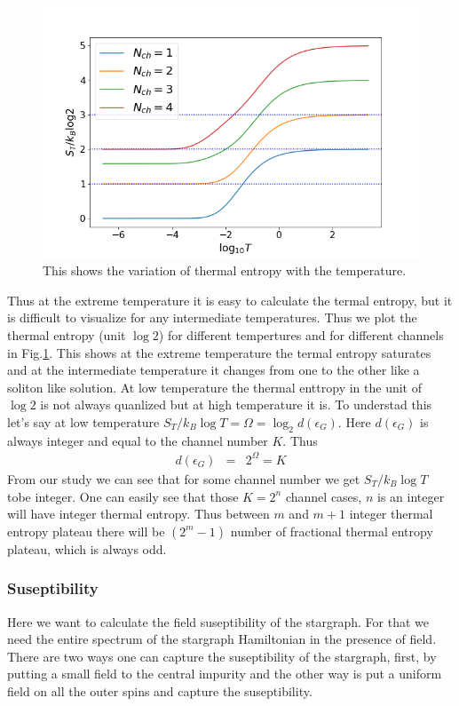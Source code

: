\documentclass[reprint,prb,superscriptaddress]{revtex4-1}
\begin{document}
\begin{figure}
\centering
\includegraphics[scale=0.36]{plt/ThermalEntanglementVS_LogTemperature_}
\caption{This shows the variation of thermal entropy with the temperature.}
\label{fig:thermal_entropy}
\end{figure}

Thus at the extreme temperature it is easy to calculate the termal entropy, but it is difficult to visualize for any intermediate temperatures. Thus we plot the thermal entropy (unit $\log 2$) for different tempertures and for different channels in Fig.\ref{fig:thermal_entropy}. This shows at the extreme temperature the termal entropy saturates and at the intermediate temperature it changes from one to the other like a soliton like solution. At low temperature the thermal enttropy in the unit of $\log 2$ is not always quanlized but at high temperature it is. To understad this let's say at low temperature $S_T/k_B\log T=\Omega=\log_2 d(\epsilon_{G})$. Here $d(\epsilon_{G})$ is always integer and equal to the channel number $K$. Thus 
\begin{eqnarray}
d(\epsilon_{G}) &=& 2^{\Omega}=K
\end{eqnarray}
From our study we can see that for some channel number we get $S_T/k_B\log T$ tobe integer. One can easily see that those $K=2^n$ channel cases, $n$ is an integer will have integer thermal entropy. Thus between $m$ and $m+1$ integer thermal entropy plateau there will be $(2^m-1)$ number of fractional thermal entropy plateau, which is always odd.

\subsubsection{Suseptibility}
\noindent Here we want to calculate the field suseptibility of the stargraph. For that we need the entire spectrum of the stargraph Hamiltonian in the presence of field. There are two ways one can capture the suseptibility of the stargraph, first, by putting a small field to the central impurity and the other way is put a uniform field on all the outer spins and capture the suseptibility.
\end{document}
